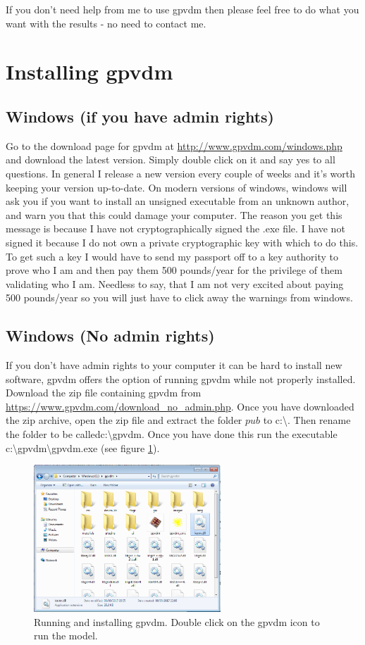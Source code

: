 If you don't need help from me to use gpvdm then please feel free to do what you want with the results - no need to contact me.

\section{Installing gpvdm}

\subsection{Windows (if you have admin rights)}
Go to the download page for gpvdm at \url{http://www.gpvdm.com/windows.php} and download the latest version.  Simply double click on it and say yes to all questions.  In general I release a new version every couple of weeks and it's worth keeping your version up-to-date. On modern versions of windows, windows will ask you if you want to install an unsigned executable from an unknown author, and warn you that this could damage your computer.  The reason you get this message is because I have not cryptographically signed the .exe file. I have not signed it because I do not own a private cryptographic key with which to do this.  To get such a key I would have to send my passport off to a key authority to prove who I am and then pay them 500 pounds/year for the privilege of them validating who I am.  Needless to say, that I am not very excited about paying 500 pounds/year so you will just have to click away the warnings from windows.

\subsection{Windows (No admin rights)}
If you don't have admin rights to your computer it can be hard to install new software, gpvdm offers the option of running gpvdm while not properly installed.  Download the zip file containing gpvdm from \url{https://www.gpvdm.com/download_no_admin.php}.  Once you have downloaded the zip archive, open the zip file and extract the folder $pub$ to c:\textbackslash . Then rename the folder to be calledc:\textbackslash gpvdm.  Once you have done this run the executable c:\textbackslash gpvdm\textbackslash gpvdm.exe (see figure \ref{fig:directory}).

\begin{figure}
\centering
\includegraphics[width=70mm]{./images/dir.png}
\caption{Running and installing gpvdm.  Double click on the gpvdm icon to run the model.}
\label{fig:directory}
\end{figure}

